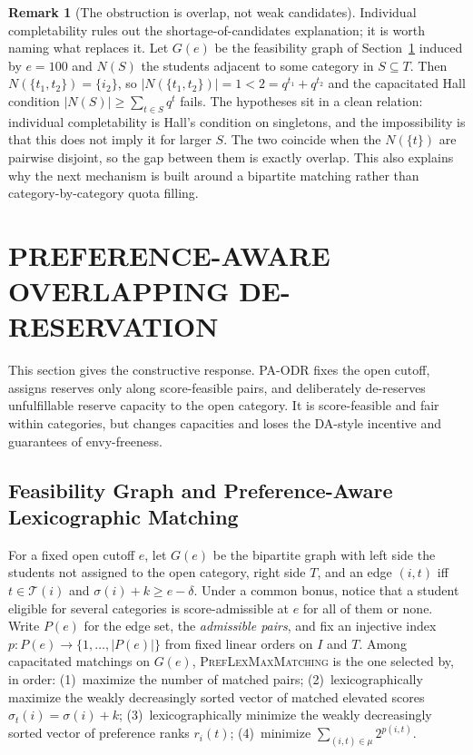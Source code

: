 \documentclass[a4paper,twoside]{article}
\theoremstyle{definition}
\newtheorem{nremark}{Remark}
\renewcommand{\T}{\mathcal{T}}
\begin{document}
\begin{nremark}[The obstruction is overlap, not weak candidates]
\label{rem:hall}
Individual completability rules out the shortage-of-candidates explanation; it is worth naming what replaces it. Let $G(e)$ be the feasibility graph of Section~\ref{sec:paodr} induced by $e=100$ and $N(S)$ the students adjacent to some category in $S\subseteq T$. Then $N(\{t_1,t_2\})=\{i_2\}$, so $|N(\{t_1,t_2\})|=1<2=q^{t_1}+q^{t_2}$ and the capacitated Hall condition $|N(S)|\ge\sum_{t\in S}q^t$ fails. The hypotheses sit in a clean relation: individual completability is Hall's condition on singletons, and the impossibility is that this does not imply it for larger $S$. The two coincide when the $N(\{t\})$ are pairwise disjoint, so the gap between them is exactly overlap. This also explains why the next mechanism is built around a bipartite matching rather than category-by-category quota filling.
\end{nremark}

\section{\uppercase{Preference-Aware Overlapping De-Reservation}}
\label{sec:paodr}


This section gives the constructive response. PA-ODR fixes the open cutoff, assigns reserves only along score-feasible pairs, and deliberately de-reserves unfulfillable reserve capacity to the open category. It is score-feasible and fair within categories, but changes capacities and loses the DA-style incentive and guarantees of envy-freeness.

\subsection{Feasibility Graph and Preference-Aware Lexicographic Matching}

For a fixed open cutoff $e$, let $G(e)$ be the bipartite graph with left side the students not assigned to the open category, right side $T$, and an edge $(i,t)$ iff $t\in\T(i)$ and $\sigma(i)+k\ge e-\delta$. Under a common bonus, notice that a student eligible for several categories is score-admissible at $e$ for all of them or none. Write $P(e)$ for the edge set, the \emph{admissible pairs}, and fix an injective index $p:P(e)\to\{1,\dots,|P(e)|\}$ from fixed linear orders on $I$ and $T$. Among capacitated matchings on $G(e)$, \textsc{PrefLexMaxMatching} is the one selected by, in order: (1)~maximize the number of matched pairs; (2)~lexicographically maximize the weakly decreasingly sorted vector of matched elevated scores $\sigma_t(i)=\sigma(i)+k$; (3)~lexicographically minimize the weakly decreasingly sorted vector of preference ranks $r_i(t)$; (4)~minimize $\sum_{(i,t)\in\mu}2^{p(i,t)}$.
\end{document}
